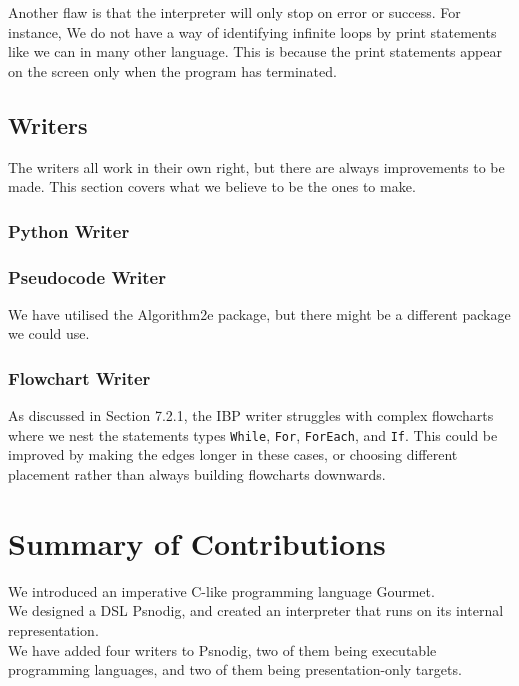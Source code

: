 Another flaw is that the interpreter will only stop on error or success. For instance, We do not have a way of identifying infinite loops by print statements like we can in many other language. This is because the print statements appear on the screen only when the program has terminated.

\subsection{Writers}

The writers all work in their own right, but there are always improvements to be made. This section covers what we believe to be the ones to make.

\subsubsection{Python Writer}



\subsubsection{Pseudocode Writer}

We have utilised the Algorithm2e package, but there might be a different package we could use.

\subsubsection{Flowchart Writer}

As discussed in Section 7.2.1, the IBP writer struggles with complex flowcharts where we nest the statements types \texttt{While}, \texttt{For}, \texttt{ForEach}, and \texttt{If}. This could be improved by making the edges longer in these cases, or choosing different placement rather than always building flowcharts downwards.

\section{Summary of Contributions}

We introduced an imperative C-like programming language Gourmet. \\

We designed a DSL Psnodig, and created an interpreter that runs on its internal representation. \\

We have added four writers to Psnodig, two of them being executable programming languages, and two of them being presentation-only targets.